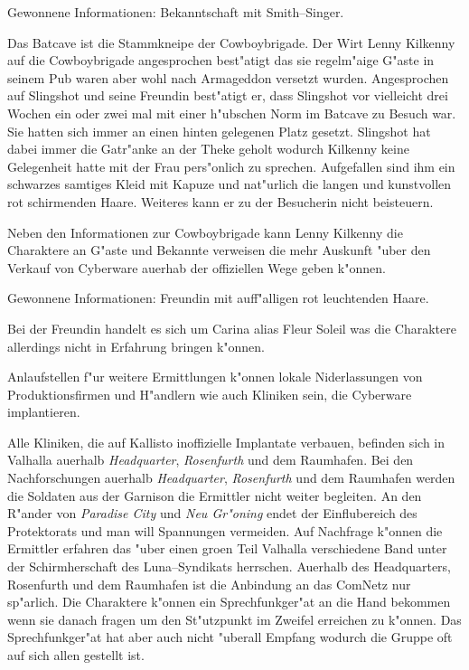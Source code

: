 \begin{remarks}
	Gewonnene Informationen: Bekanntschaft mit Smith--Singer.	
\end{remarks}


Das Batcave ist die Stammkneipe der Cowboybrigade. Der Wirt Lenny Kilkenny auf die Cowboybrigade angesprochen best"atigt das sie regelm"a\3ige G"aste in seinem Pub waren aber wohl nach Armageddon versetzt wurden. Angesprochen auf Slingshot und seine Freundin best"atigt er, dass Slingshot vor vielleicht drei Wochen ein oder zwei mal mit einer h"ubschen Norm im Batcave zu Besuch war. Sie hatten sich immer an einen hinten gelegenen Platz gesetzt. Slingshot hat dabei immer die Gatr"anke an der Theke geholt wodurch Kilkenny keine Gelegenheit hatte mit der Frau pers"onlich zu sprechen. Aufgefallen sind ihm ein schwarzes samtiges Kleid mit Kapuze und nat"urlich die langen und kunstvollen rot schirmenden Haare. Weiteres kann er zu der Besucherin nicht beisteuern.

Neben den Informationen zur Cowboybrigade kann Lenny Kilkenny die Charaktere an G"aste und Bekannte verweisen die mehr Auskunft "uber den Verkauf von Cyberware au\3erhab der offiziellen Wege geben k"onnen.

\begin{remarks}
	Gewonnene Informationen: Freundin mit auff"alligen rot leuchtenden Haare. 
	
	Bei der Freundin handelt es sich um Carina alias Fleur Soleil was die Charaktere allerdings nicht in Erfahrung bringen k"onnen.
\end{remarks}	


Anlaufstellen f"ur weitere Ermittlungen k"onnen lokale Niderlassungen von Produktionsfirmen und H"andlern wie auch Kliniken sein, die Cyberware implantieren.

Alle Kliniken, die auf Kallisto inoffizielle Implantate verbauen, befinden sich in Valhalla au\3erhalb \emph{Headquarter}, \emph{Rosenfurth} und dem Raumhafen. Bei den Nachforschungen au\3erhalb \emph{Headquarter}, \emph{Rosenfurth} und dem Raumhafen werden die Soldaten aus der Garnison die Ermittler nicht weiter begleiten. An den R"ander von \emph{Paradise City} und \emph{Neu Gr"oning} endet der Einflu\3bereich des Protektorats und man will Spannungen vermeiden. Auf Nachfrage k"onnen die Ermittler erfahren das "uber einen gro\3en Teil Valhalla verschiedene Band unter der Schirmherschaft des Luna--Syndikats herrschen. Au\3erhalb des Headquarters, Rosenfurth und dem Raumhafen ist die Anbindung an das ComNetz nur sp"arlich. Die Charaktere k"onnen ein Sprechfunkger"at an die Hand bekommen wenn sie danach fragen um den St"utzpunkt im Zweifel erreichen zu k"onnen. Das Sprechfunkger"at hat aber auch nicht "uberall Empfang wodurch die Gruppe oft auf sich allen gestellt ist.

